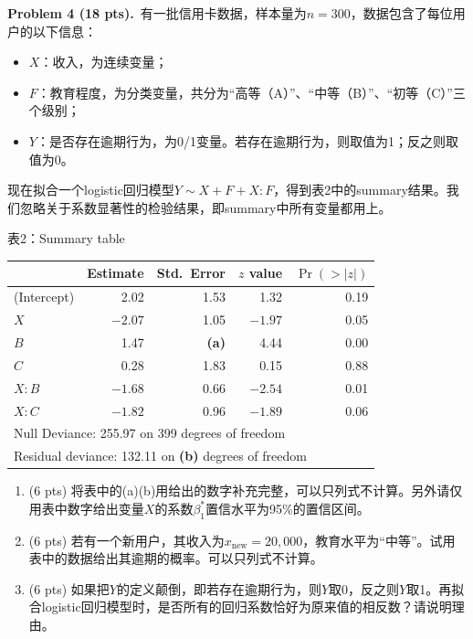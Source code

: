 \documentclass[UTF8,a4paper,11pt,fontset=fandol]{ctexart}
\newcommand{\problem}[2]{\par\addvspace{10pt}\Needspace{5\baselineskip}\textbf{Problem #1 (#2 pts).}\ }
\newcommand{\tabletitle}[1]{\par\smallskip\begin{center}#1\end{center}\vspace{-5pt}}
\begin{document}
\newpage
\problem{4}{18}有一批信用卡数据，样本量为$n=300$，数据包含了每位用户的以下信息：
\begin{itemize}
  \item $X$：收入，为连续变量；
  \item $F$：教育程度，为分类变量，共分为“高等（A）”、“中等（B）”、“初等（C）”三个级别；
  \item $Y$：是否存在逾期行为，为0/1变量。若存在逾期行为，则取值为1；反之则取值为0。
\end{itemize}
现在拟合一个logistic回归模型$Y\sim X+F+X:F$，得到表2中的summary结果。我们忽略关于系数显著性的检验结果，即summary中所有变量都用上。

\tabletitle{表2：Summary table}
\begin{center}
\small
\renewcommand{\arraystretch}{1.12}
\begin{tabular}{lrrrr}
\toprule
 & Estimate & Std.\ Error & $z$ value & $\Pr(>|z|)$\\
\midrule
(Intercept) & 2.02 & 1.53 & 1.32 & 0.19\\
$X$ & $-2.07$ & 1.05 & $-1.97$ & 0.05\\
$B$ & 1.47 & \textbf{(a)} & 4.44 & 0.00\\
$C$ & 0.28 & 1.83 & 0.15 & 0.88\\
$X:B$ & $-1.68$ & 0.66 & $-2.54$ & 0.01\\
$X:C$ & $-1.82$ & 0.96 & $-1.89$ & 0.06\\
\midrule
\multicolumn{5}{l}{Null Deviance: 255.97 on 399 degrees of freedom}\\
\multicolumn{5}{l}{Residual deviance: 132.11 on \textbf{(b)} degrees of freedom}\\
\bottomrule
\end{tabular}
\end{center}
\begin{enumerate}
  \item (6 pts) 将表中的(a)(b)用给出的数字补充完整，可以只列式不计算。另外请仅用表中数字给出变量$X$的系数$\beta_1^*$置信水平为95\%的置信区间。
  \item (6 pts) 若有一个新用户，其收入为$x_{\mathrm{new}}=20{,}000$，教育水平为“中等”。试用表中的数据给出其逾期的概率。可以只列式不计算。
  \item (6 pts) 如果把$Y$的定义颠倒，即若存在逾期行为，则$Y$取0，反之则$Y$取1。再拟合logistic回归模型时，是否所有的回归系数恰好为原来值的相反数？请说明理由。
\end{enumerate}
\end{document}
